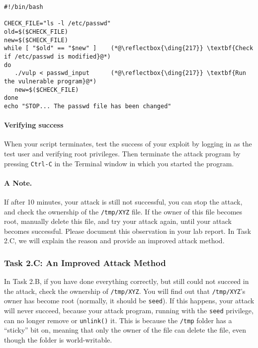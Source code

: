 \begin{lstlisting}
#!/bin/bash

CHECK_FILE="ls -l /etc/passwd"
old=$($CHECK_FILE)
new=$($CHECK_FILE)
while [ "$old" == "$new" ]    (*@\reflectbox{\ding{217}} \textbf{Check if /etc/passwd is modified}@*)
do
   ./vulp < passwd_input      (*@\reflectbox{\ding{217}} \textbf{Run the vulnerable program}@*)
   new=$($CHECK_FILE)
done
echo "STOP... The passwd file has been changed"
\end{lstlisting}

\paragraph{Verifying success}
When your script terminates,
test the success of your exploit by logging in as the test user and
verifying root privileges.  Then terminate the attack program by pressing \texttt{Ctrl-C} in the Terminal window in which you started the program.


\paragraph{A Note.}
If after 10 minutes, your attack is still not 
successful, you can stop the attack, and check the ownership
of the \texttt{/tmp/XYZ} file. If the owner of this file
becomes root, manually delete this file, and try your 
attack again, until your attack becomes successful. 
Please document this observation in your lab report. 
In Task 2.C, we will explain the reason and provide
an improved attack method. 



\subsubsection{Task 2.C: An Improved Attack Method}

In Task 2.B, if you have done everything correctly, but still could not succeed
in the attack, check the ownership of \texttt{/tmp/XYZ}. You will find out    
that \texttt{/tmp/XYZ}'s owner has become root (normally, it should be \texttt{seed}). 
If this happens, your attack will never succeed, because your attack
program, running with the \texttt{seed} privilege, can no longer remove or
\texttt{unlink()} it.  
This is because the \texttt{/tmp}
folder has a ``sticky'' bit on, meaning that only the owner of the file can
delete the file, even though the folder is world-writable. 



